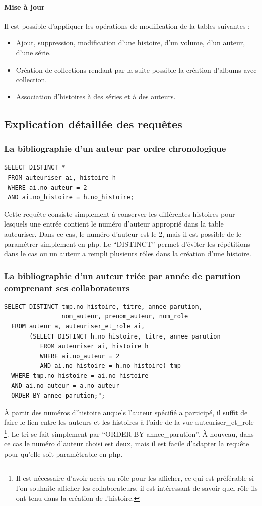 \documentclass[12pt]{article}
\begin{document}
\paragraph{Mise à jour}
Il est possible d'appliquer les opérations de modification de la tables
suivantes :
\begin{itemize}
	\item Ajout, suppression, modification d’une histoire, d’un volume, d’un
		auteur, d'une série.
	\item Création de collections rendant par la suite possible la création
		d'albums avec collection.
	\item Association d'histoires à des séries et à des auteurs.
\end{itemize}

\subsection{Explication détaillée des requêtes}

\subsubsection*{La bibliographie d'un auteur par ordre chronologique}
\begin{lstlisting}
SELECT DISTINCT *
 FROM auteuriser ai, histoire h
 WHERE ai.no_auteur = 2
 AND ai.no_histoire = h.no_histoire;
\end{lstlisting}
Cette requête consiste simplement à conserver les différentes histoires pour
lesquels une entrée contient le numéro d'auteur approprié dans la table
auteuriser. Dans ce cas, le numéro d'auteur est le 2, mais il est possible
de le paramétrer simplement en php. Le ``DISTINCT'' permet d'éviter les
répétitions dans le cas ou un auteur a rempli plusieurs rôles dans la
création d'une histoire.

\subsubsection*{La bibliographie d'un auteur triée par année de parution
comprenant ses collaborateurs}
\begin{lstlisting}
SELECT DISTINCT tmp.no_histoire, titre, annee_parution,
                nom_auteur, prenom_auteur, nom_role
  FROM auteur a, auteuriser_et_role ai,
       (SELECT DISTINCT h.no_histoire, titre, annee_parution
          FROM auteuriser ai, histoire h
          WHERE ai.no_auteur = 2
          AND ai.no_histoire = h.no_histoire) tmp
  WHERE tmp.no_histoire = ai.no_histoire
  AND ai.no_auteur = a.no_auteur
  ORDER BY annee_parution;";
\end{lstlisting}
À partir des numéros d'histoire auquels l'auteur spécifié a participé, il
suffit de faire le lien entre les auteurs et les histoires à l'aide de la vue
auteuriser\_et\_role \footnote{Il est nécessaire d'avoir accès au rôle pour
les afficher, ce qui est préférable si l'on souhaite afficher les
collaborateurs, il est intéressant de savoir quel rôle ils ont tenu dans la
création de l'histoire.}. Le tri se fait simplement par
``ORDER BY annee\_parution''. À nouveau, dans ce cas le numéro d'auteur
choisi est deux, mais il est facile d'adapter la requête pour qu'elle soit
paramétrable en php.
\end{document}
